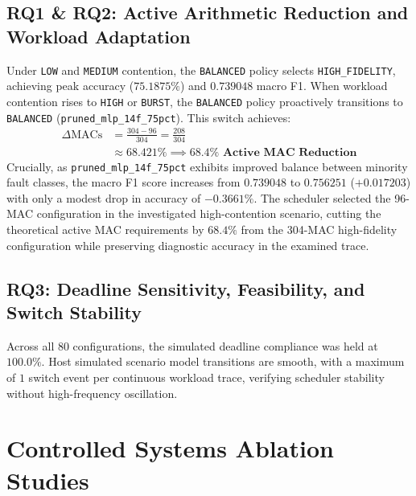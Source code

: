 \documentclass[journal]{IEEEtran}
\begin{document}
\subsection{RQ1 \& RQ2: Active Arithmetic Reduction and Workload Adaptation}
Under \texttt{LOW} and \texttt{MEDIUM} contention, the \texttt{BALANCED} policy selects \texttt{HIGH\_FIDELITY}, achieving peak accuracy ($75.1875\%$) and $0.739048$ macro F1. When workload contention rises to \texttt{HIGH} or \texttt{BURST}, the \texttt{BALANCED} policy proactively transitions to \texttt{BALANCED} (\texttt{pruned\_mlp\_14f\_75pct}). This switch achieves:
\begin{equation}
\begin{split}
    \Delta \text{MACs} &= \frac{304 - 96}{304} = \frac{208}{304} \\
             &\approx 68.421\% \implies \mathbf{68.4\% \text{ Active MAC Reduction}}
\end{split}
\end{equation}
Crucially, as \texttt{pruned\_mlp\_14f\_75pct} exhibits improved balance between minority fault classes, the macro F1 score increases from $0.739048$ to $\mathbf{0.756251}$ ($+0.017203$) with only a modest drop in accuracy of $-0.3661\%$. The scheduler selected the 96-MAC configuration in the investigated high-contention scenario, cutting the theoretical active MAC requirements by $68.4\%$ from the 304-MAC high-fidelity configuration while preserving diagnostic accuracy in the examined trace.

\subsection{RQ3: Deadline Sensitivity, Feasibility, and Switch Stability}
Across all 80 configurations, the simulated deadline compliance was held at $100.0\%$. Host simulated scenario model transitions are smooth, with a maximum of $1$ switch event per continuous workload trace, verifying scheduler stability without high-frequency oscillation.

\section{Controlled Systems Ablation Studies}
\end{document}
